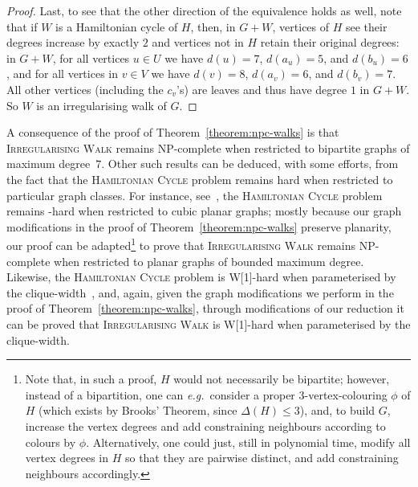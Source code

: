 \documentclass[a4paper,11pt,dvipsnames]{elsarticle}
\newcommand{\commenttext}[1]{ \begin{center} {\fbox{\begin{minipage}[h]{0.9 \linewidth}   {\textsf{ #1}} \end{minipage} }} \end{center}}
\newcommand{\Sam}[1]{{\color{red}\commenttext{Sam : #1}}}
\newcommand{\Sam}[1]{}
\begin{document}
\begin{proof}
Last, to see that the other direction of the equivalence holds as well, note that if $W$ is a Hamiltonian cycle of $H$,
then, in $G+W$, vertices of $H$ see their degrees increase by exactly $2$ and vertices not in $H$ retain their original degrees:
in $G+W$,
for all vertices $u\in U$ we have $d(u)=7$, $d(a_u)=5$, and $d(b_u)=6$, and for all vertices in $v\in V$
we have $d(v)=8$, $d(a_v)=6$, and $d(b_v)=7$. All other vertices (including the $c_v$'s) are leaves and
thus have degree $1$ in $G+W$. So $W$ is an irregularising walk of $G$.
\end{proof}

A consequence of the proof of Theorem~\ref{theorem:npc-walks} is that \textsc{Irregularising Walk} remains \textsf{NP}-complete
when restricted to bipartite graphs of maximum degree~$7$. Other such results can be deduced, with some efforts, from the fact that the \textsc{Hamiltonian Cycle} problem remains hard when restricted to particular graph classes. For instance, see~\cite{GJT76}, the \textsc{Hamiltonian Cycle} problem remains \np-hard when restricted to cubic planar graphs; mostly because our graph modifications in the proof of Theorem~\ref{theorem:npc-walks} preserve planarity, our proof can be adapted\footnote{Note that, in such a proof, $H$ would not necessarily be bipartite; however, instead of a bipartition, one can \textit{e.g.}~consider a proper $3$-vertex-colouring $\phi$ of $H$ (which exists by Brooks' Theorem, since $\Delta(H) \leq 3$), and, to build $G$, increase the vertex degrees and add constraining neighbours according to colours by $\phi$. Alternatively, one could just, still in polynomial time, modify all vertex degrees in $H$ so that they are pairwise distinct, and add constraining neighbours accordingly.} to prove that \textsc{Irregularising Walk} remains \textsf{NP}-complete
when restricted to planar graphs of bounded maximum degree.
Likewise, the \textsc{Hamiltonian Cycle} problem is \textsf{W[1]}-hard when parameterised by the clique-width~\cite{FGLS10}, and, again, given the graph modifications we perform in the proof of Theorem~\ref{theorem:npc-walks}, through modifications of our reduction it can be proved that \textsc{Irregularising Walk} is \textsf{W[1]}-hard when parameterised by the clique-width.
\end{document}
